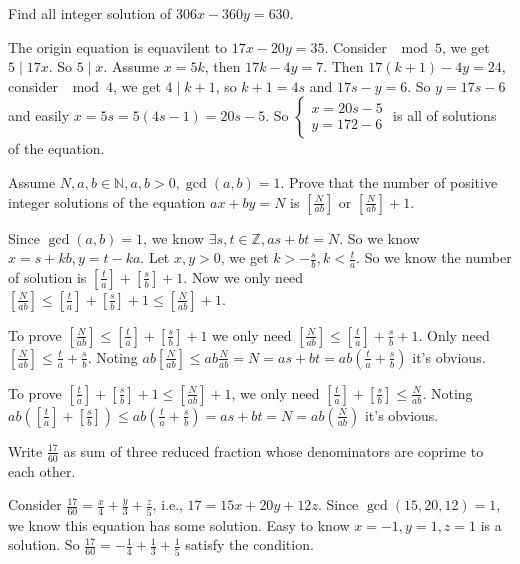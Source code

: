 \documentclass{ctexart}
\begin{document}
\begin{problem}\label{pro:p23.1.b}
Find all integer solution of \(306x-360y=630\).
\end{problem}
\begin{solution}
	The origin equation is equavilent to \(17x-20y=35\).
	Consider \(\mod 5\), we get \(5 \mid 17 x\). So \(5 \mid x\).
	Assume \(x=5k\), then \(17k-4y=7\).
	Then \(17(k+1)-4y=24\), consider \(\mod 4\), we get \(4 \mid k+1\), so \(k+1=4s\) and \(17s-y=6\).
	So \(y=17s-6\) and easily \(x=5s=5(4s-1)=20s-5\).
	So \(\begin{cases}
		x=20s-5 \\
		y=172-6
	\end{cases}\) is all of solutions of the equation.
\end{solution}
\begin{problem}\label{pro:p23.3}
Assume \(N,a,b \in \mathbb{N},a,b>0,\gcd(a,b)=1\).
Prove that the number of positive integer solutions of the equation \(ax+by=N\)
is \(\left[\frac{N}{ab}\right]\) or \(\left[\frac{N}{ab}\right]+1\).
\end{problem}

\begin{solution}
	Since \(\gcd(a,b)=1\), we know \(\exists s,t \in \mathbb{Z},as+bt=N\).
	So we know \(x=s+kb,y=t-ka\). Let \(x,y>0\), we get \(k> -\frac{s}{b},k<\frac{t}{a}\).
	So we know the number of solution is \(\left[\frac{t}{a}\right]+\left[\frac{s}{b}\right]+1\).
	Now we only need \(\left[\frac{N}{ab}\right]\leq\left[\frac{t}{a}\right]+\left[\frac{s}{b}\right]+1 \leq \left[\frac{N}{ab}\right]+1\).

	To prove \(\left[\frac{N}{ab}\right]\leq\left[\frac{t}{a}\right]+\left[\frac{s}{b}\right]+1\) we only need
	\(\left[\frac{N}{ab}\right]\leq\left[\frac{t}{a}\right]+\frac{s}{b}+1\).
	Only need \(\left[\frac{N}{ab}\right]\leq\frac{t}{a}+\frac{s}{b}\).
	Noting \(ab \left[\frac{N}{ab}\right] \leq ab \frac{N}{ab}=N=as+bt=ab(\frac{t}{a}+\frac{s}{b})\) it's obvious.

	To prove \(\left[\frac{t}{a}\right]+\left[\frac{s}{b}\right]+1 \leq \left[\frac{N}{ab}\right]+1\),
	we only need \(\left[\frac{t}{a}\right]+\left[\frac{s}{b}\right] \leq \frac{N}{ab}\).
	Noting \(ab(\left[\frac{t}{a}\right]+\left[\frac{s}{b}\right]) \leq ab(\frac{t}{a}+\frac{s}{b})=as+bt=N=ab(\frac{N}{ab})\) it's obvious.
\end{solution}
\begin{problem}\label{pro:p24.2}
Write \(\frac{17}{60}\) as sum of three reduced fraction whose denominators are coprime to each other.
\end{problem}
\begin{solution}
	Consider \(\frac{17}{60}=\frac{x}{4}+\frac{y}{3}+\frac{z}{5}\), i.e., \(17=15x+20y+12z\).
	Since \(\gcd(15,20,12)=1\), we know this equation has some solution.
	Easy to know \(x=-1,y=1,z=1\) is a solution.
	So \(\frac{17}{60}=-\frac{1}{4}+\frac{1}{3}+\frac{1}{5}\) satisfy the condition.
\end{solution}
\end{document}
